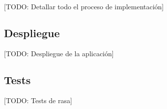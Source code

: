 [TODO: Detallar todo el proceso de implementación]

\subsection{Despliegue}
[TODO: Despliegue de la aplicación]

\subsection{Tests}
[TODO: Tests de rasa]

